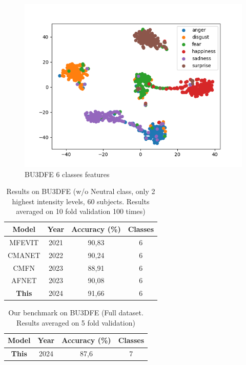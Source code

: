 \raggedbottom
\begin{figure}
    \centering
    \includegraphics[width=1.1\columnwidth]{Images/BU3DFE_6_features.png}
    \caption{BU3DFE 6 classes features}
    \label{BU3DFE_stats}
\end{figure}

\begin{table}[H]
    \centering
    \captionsetup{justification=centering, width=0.8\columnwidth} %
    \caption{Results on BU3DFE (w/o Neutral class, 
    only 2 highest intensity levels, 60 subjects.
    Results averaged on 10 fold validation 100 times)} 
    \begin{tabular}{cccc}
    \hline
    Model & Year & Accuracy (\%)& Classes\\
    \hline
    MFEVIT \cite{RW_8D_MFEVIT} &2021 & 90,83& 6\\
    \hline
    CMANET \cite{RW_8B_CMANET} & 2022 & 90,24 & 6 \\
    \hline
    CMFN \cite{RW_9_CMFN} & 2023 & 88,91 & 6\\
    \hline
    AFNET \cite{RW_8A_AFNET} & 2023  & 90,08& 6\\
    \hline
    \textbf{This} &  2024  & 91,66& 6\\                                               
    \hline
    \end{tabular}
    \label{res_tab1}
\end{table}

\begin{table}[H]
    \centering
    \captionsetup{justification=centering, width=0.8\columnwidth} %
    \caption{Our benchmark on BU3DFE (Full dataset. Results averaged on 5 fold validation)} 
    \begin{tabular}{cccc}
    \hline
    Model & Year & Accuracy (\%)& Classes\\
    \hline
    \textbf{This} &  2024  & 87,6 & 7\\                                          
    \hline
    \end{tabular}
    \label{res_tab2}
\end{table}


